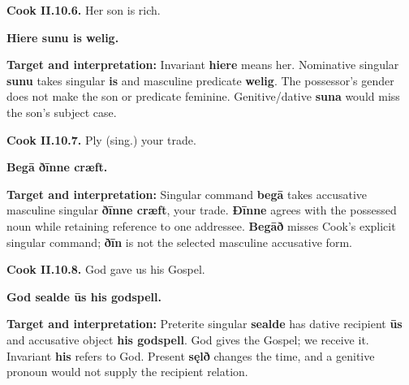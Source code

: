 \par\begin{minipage}{\linewidth}\raggedright
\textbf{Cook II.10.6.} Her son is rich.

\textbf{Hiere sunu is welig.}

\textbf{Target and interpretation:} Invariant \textbf{hiere} means her. Nominative singular \textbf{sunu} takes singular \textbf{is} and masculine predicate \textbf{welig}. The possessor's gender does not make the son or predicate feminine. Genitive/\allowbreak{}dative \textbf{suna} would miss the son's subject case.

\end{minipage}\par\addvspace{4pt}

\par\begin{minipage}{\linewidth}\raggedright
\textbf{Cook II.10.7.} Ply (sing.) your trade.

\textbf{Begā ðīnne cræft.}

\textbf{Target and interpretation:} Singular command \textbf{begā} takes accusative masculine singular \textbf{ðīnne cræft}, your trade. \textbf{Ðīnne} agrees with the possessed noun while retaining reference to one addressee. \textbf{Begāð} misses Cook's explicit singular command; \textbf{ðīn} is not the selected masculine accusative form.

\end{minipage}\par\addvspace{4pt}

\par\begin{minipage}{\linewidth}\raggedright
\textbf{Cook II.10.8.} God gave us his Gospel.

\textbf{God sealde ūs his godspell.}

\textbf{Target and interpretation:} Preterite singular \textbf{sealde} has dative recipient \textbf{ūs} and accusative object \textbf{his godspell}. God gives the Gospel; we receive it. Invariant \textbf{his} refers to God. Present \textbf{sęlð} changes the time, and a genitive pronoun would not supply the recipient relation.

\end{minipage}\par\addvspace{4pt}


